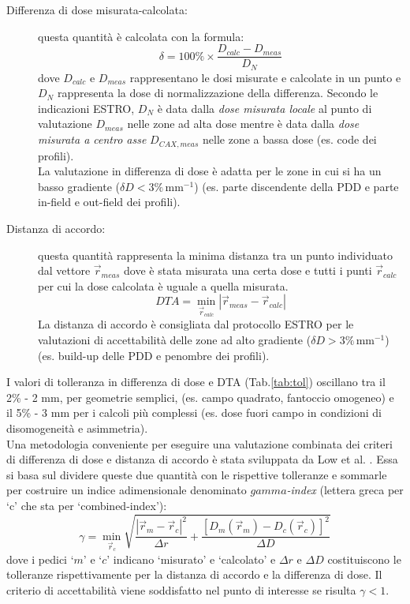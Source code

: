 \begin{description}

\item[Differenza di dose misurata-calcolata:] questa quantità è calcolata con la formula:
\begin{equation}
\delta = 100\% \times \frac{D_{calc} - D_{meas}}{D_{N}}
\end{equation}
dove $D_{calc}$ e $D_{meas}$ rappresentano le dosi misurate e calcolate in un punto e $D_N$ rappresenta la dose di normalizzazione della differenza. Secondo le indicazioni ESTRO, $D_N$ è data dalla \textit{dose misurata locale} al punto di valutazione $D_{meas}$ nelle zone ad alta dose mentre è data dalla \textit{dose misurata a centro asse}  $D_{CAX,meas}$ nelle zone a bassa dose (es. code dei profili).\\
La valutazione in differenza di dose è adatta per le zone in cui si ha un basso gradiente ($\delta D < 3\%\,$mm$^{-1}$) (es. parte discendente della PDD e parte in-field e out-field dei profili).

\item[Distanza di accordo:] questa quantità rappresenta la minima distanza tra un punto individuato dal vettore $\vec{r}_{meas}$ dove è stata misurata una certa dose e tutti i punti $\vec{r}_{calc}$ per cui la dose calcolata è  uguale a quella misurata.
\begin{equation}
DTA = \min_{\vec{r}_{calc}} \left|\vec{r}_{meas} - \vec{r}_{calc}\right|
\end{equation}
La distanza di accordo è consigliata dal protocollo ESTRO per le valutazioni di accettabilità delle zone ad alto gradiente ($\delta D > 3\%\,$mm$^{-1}$) (es. build-up delle PDD e penombre dei profili).
\end{description}

I valori di tolleranza in differenza di dose e DTA (Tab.\ref{tab:tol}) oscillano tra il 2\% - 2 mm, per geometrie semplici, (es. campo quadrato, fantoccio omogeneo) e il 5\% - 3 mm per i calcoli più complessi (es. dose fuori campo in condizioni di disomogeneità e asimmetria).\\
Una metodologia conveniente per eseguire una valutazione combinata dei criteri di differenza di dose e distanza di accordo è stata sviluppata da Low et al. \cite{Low1998}. Essa si basa sul dividere queste due quantità con le rispettive tolleranze e sommarle per costruire un indice adimensionale denominato \textit{$gamma$-index} (lettera greca per `c' che sta per `combined-index'):
\begin{equation}
\gamma = \min_{\vec{r}_{c}} \sqrt{\frac{|\vec{r}_{m}-\vec{r}_{c}|^2}{\Delta r}   + \frac{\left[D_{m}(\vec{r}_{m})-D_{c}(\vec{r}_{c})\right]^2}{\Delta D} }
\label{eq:gamma}
\end{equation}
dove i pedici `$m$' e `$c$' indicano `misurato' e `calcolato' e $\Delta r$ e $\Delta D$ costituiscono le tolleranze rispettivamente per la distanza di accordo e la differenza di dose. Il criterio di accettabilità viene soddisfatto nel punto di interesse se risulta $\gamma < 1$.

